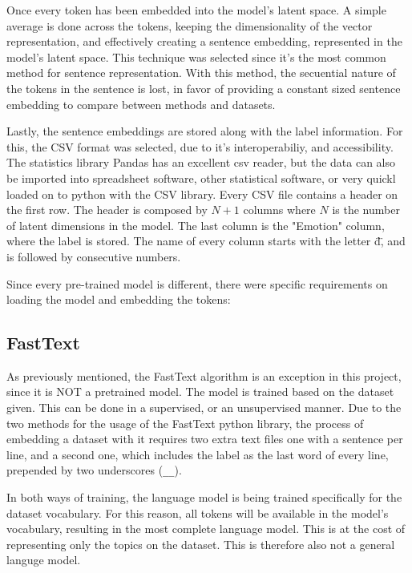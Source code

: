 Once every token has been embedded into the model's latent space. A simple average is done across the tokens, keeping the dimensionality of the vector representation, and effectively creating a sentence embedding, represented in the model's latent space. This technique was selected since it's the most common method for sentence representation. With this method, the secuential nature of the tokens in the sentence is lost, in favor of providing a constant sized sentence embedding to compare between methods and datasets.

Lastly, the sentence embeddings are stored along with the label information. For this, the CSV format was selected, due to it's interoperabiliy, and accessibility. The statistics library Pandas has an excellent csv reader, but the data can also be imported into spreadsheet software, other statistical software, or very quickl loaded on to python with the CSV library. Every CSV file contains a header on the first row. The header is composed by $N+1$ columns where $N$ is the number of latent dimensions in the model. The last column is the "Emotion" column, where the label is stored. The name of every column starts with the letter \"d\", and is followed by consecutive numbers.

Since every pre-trained model is different, there were specific requirements on loading the model and embedding the tokens:

\subsection{FastText}\label{sub:FastText}
As previously mentioned, the FastText algorithm is an exception in this project, since it is NOT a pretrained model. The model is trained based on the dataset given. This can be done in a supervised, or an unsupervised manner. Due to the two methods for the usage of the FastText python library, the process of embedding a dataset with it requires two extra text files one with a sentence per line, and a second one, which includes the label as the last word of every line, prepended by two underscores (\lstinline{__}).

In both ways of training, the language model is being trained specifically for the dataset vocabulary. For this reason, all tokens will be available in the model's vocabulary, resulting in the most complete language model. This is at the cost of representing only the topics on the dataset. This is therefore also not a general languge model.

